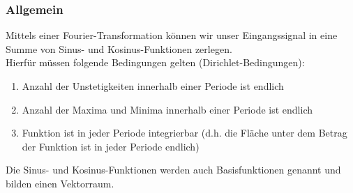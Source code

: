 \documentclass{article} %
\begin{document}
		\subsubsection{Allgemein}
		Mittels einer Fourier-Transformation können wir unser Eingangssignal in eine Summe von Sinus- und Kosinus-Funktionen zerlegen.\\
		Hierfür müssen folgende Bedingungen gelten (Dirichlet-Bedingungen):
		\begin{enumerate}
			\item Anzahl der Unstetigkeiten innerhalb einer Periode ist endlich
			\item Anzahl der Maxima und Minima innerhalb einer Periode ist endlich
			\item Funktion ist in jeder Periode integrierbar (d.h. die Fläche unter dem Betrag der Funktion ist in jeder Periode endlich)
		\end{enumerate}
		Die Sinus- und Kosinus-Funktionen werden auch Basisfunktionen genannt und bilden einen Vektorraum.
\end{document}

